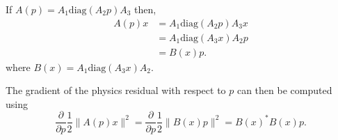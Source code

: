 \documentclass{article}
\newcommand{\be}{\begin{equation}}
\newcommand{\ee}{\end{equation}}
\newcommand{\inv}{\frac{1}}
\newcommand{\del}{\partial}
\newcommand{\der}[1]{\frac{\del}{\del #1}}
\newcommand{\diag}{\text{diag}}
\begin{document}
If $A(p) = A_1 \diag(A_2 p) A_3$ then,
\begin{align}
    A(p)x &= A_1 \diag(A_2 p) A_3 x \\
        &= A_1 \diag(A_3 x) A_2 p \\
        &= B(x) p. 
\end{align}
where $B(x) = A_1 \diag(A_3 x) A_2$.

The gradient of the physics residual with respect to $p$ can then be computed using
\be \der{p} \inv{2} \|A(p)x\|^2 = \der{p} \inv{2} \|B(x)p\|^2 = B(x)^*B(x)p. \ee


\begin{thebibliography}{99}
\end{thebibliography}
\end{document}
